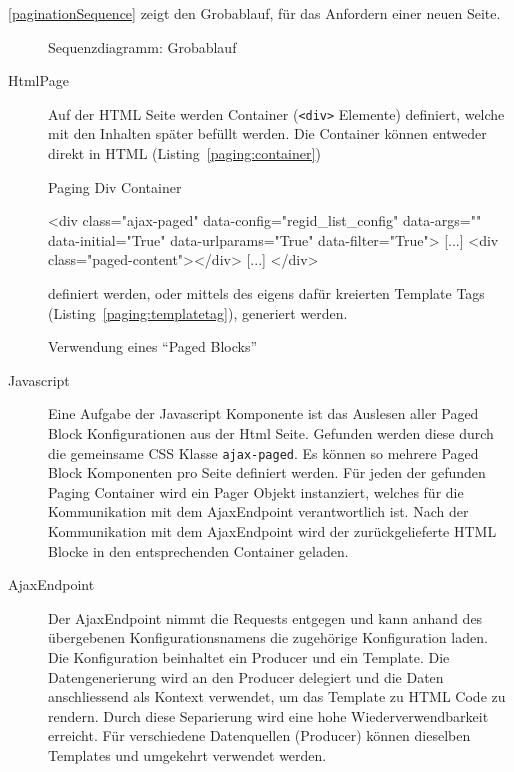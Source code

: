 \autoref{paginationSequence} zeigt den Grobablauf, für das Anfordern einer
neuen Seite.

\begin{figure}[H]	
	\centering
	
	\caption{Sequenzdiagramm: Grobablauf}
	\label{paginationSequence}
\end{figure}


\begin{description}
\item[HtmlPage]
Auf der HTML Seite werden Container (\texttt{<div>} Elemente) definiert, welche mit den Inhalten später befüllt werden. Die Container können entweder direkt in HTML  (Listing~\ref{paging:container})

\begin{listing}
\caption{Paging Div Container}
\label{paging:container}
\begin{htmlcode}
<div class="ajax-paged"
     data-config="regid_list_config"
     data-args="{}"
     data-initial="True"
     data-urlparams="True"
     data-filter="True">
	[...]
	<div class="paged-content"></div>
	[...]
</div>
\end{htmlcode}
\end{listing}

definiert werden, oder mittels des eigens dafür kreierten Template Tags (Listing~\ref{paging:templatetag}), generiert werden.

\begin{listing}
\caption{Verwendung eines \enquote{Paged Blocks}}
\label{paging:templatetag}
\begin{pythoncode}
{%
\end{pythoncode}
\end{listing}


\item[Javascript]
Eine Aufgabe der Javascript Komponente ist das Auslesen aller Paged Block Konfigurationen aus der Html Seite. Gefunden werden diese durch die gemeinsame CSS Klasse \texttt{ajax-paged}. Es können so mehrere Paged Block Komponenten pro Seite definiert werden. Für jeden der gefunden Paging Container wird ein Pager Objekt instanziert, welches für die Kommunikation mit dem AjaxEndpoint verantwortlich ist.
Nach der Kommunikation mit dem AjaxEndpoint wird der zurückgelieferte HTML Blocke in den entsprechenden Container geladen.

\item [AjaxEndpoint]
Der AjaxEndpoint nimmt die Requests entgegen und kann anhand des übergebenen Konfigurationsnamens die zugehörige Konfiguration laden.
Die Konfiguration beinhaltet ein Producer und ein Template.
Die Datengenerierung wird an den Producer delegiert und die Daten anschliessend als Kontext verwendet, um das Template zu HTML Code zu rendern.
Durch diese Separierung wird eine hohe Wiederverwendbarkeit erreicht. Für verschiedene Datenquellen (Producer) können dieselben Templates und umgekehrt verwendet werden.


\end{description}
